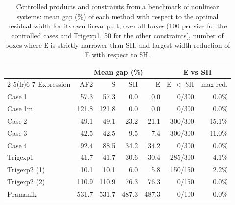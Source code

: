 \begin{table}[t]
\centering
\caption{Controlled products and constraints from a benchmark of nonlinear systems: mean gap (\%) of each method with respect to the optimal residual width for its own linear part, over all boxes (100 per size for the controlled cases and Trigexp1, 50 for the other constraints), number of boxes where E is strictly narrower than SH, and largest width reduction of E with respect to SH.}
\label{tab:expressions}
\small
\setlength{\tabcolsep}{4pt}
\begin{tabular}{lrrrrrr}
\toprule
 & \multicolumn{4}{c}{Mean gap (\%)} & \multicolumn{2}{c}{E vs SH} \\
\cmidrule(lr){2-5}\cmidrule(lr){6-7}
Expression & AF2 & S & SH & E & E $<$ SH & max red. \\
\midrule
Case 1 & 57.3 & 57.3 & 0.0 & 0.0 & 0/300 & 0.0\% \\
Case 1m & 121.8 & 121.8 & 0.0 & 0.0 & 0/300 & 0.0\% \\
Case 2 & 49.1 & 49.1 & 23.2 & 21.1 & 300/300 & 15.1\% \\
Case 3 & 42.5 & 42.5 & 9.5 & 7.4 & 300/300 & 11.0\% \\
Case 4 & 92.4 & 88.5 & 34.2 & 34.2 & 0/300 & 0.0\% \\
\midrule
Trigexp1 & 41.7 & 41.7 & 30.6 & 30.4 & 285/300 & 4.1\% \\
Trigexp2 (1) & 10.1 & 10.1 & 6.0 & 5.8 & 150/150 & 2.2\% \\
Trigexp2 (2) & 110.9 & 110.9 & 76.3 & 76.3 & 0/150 & 0.0\% \\
Pramanik & 531.7 & 531.7 & 487.3 & 487.3 & 0/100 & 0.0\% \\
\bottomrule
\end{tabular}
\end{table}